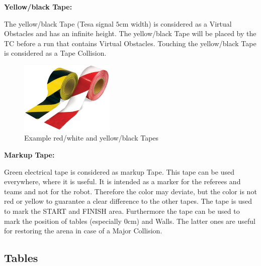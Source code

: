 \textbf{Yellow/black Tape:}

The yellow/black Tape (Tesa signal $5\si{\centi\meter}$ width) is considered as a Virtual Obstacles and has an infinite height. The yellow/black Tape will be placed by the TC before a run that contains Virtual Obstacles. Touching the yellow/black Tape is considered as a Tape Collision.

\begin{figure} [h!]
	\centering
	\includegraphics[width= 0.4\textwidth ]{./images/general_rules/example_barrier_tape}
	\caption{Example red/white and yellow/black Tapes}
	\label{fig:tapes}
\end{figure}

\textbf{Markup Tape:}

Green electrical tape is considered as markup Tape. This tape can be used everywhere, where it is useful. It is intended as a marker for the referees and teams and not for the robot. Therefore the color may deviate, but the color is not red or yellow to guarantee a clear difference to the other tapes. The tape is used to mark the START and FINISH area. Furthermore the tape can be used to mark the position of tables (especially $0\si{\centi\meter}$) and Walls. The latter ones are useful for restoring the arena in case of a Major Collision.


\subsection{Tables}
\label{subsec: Tables}






